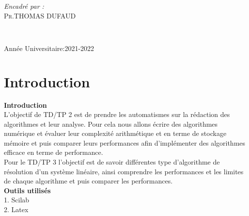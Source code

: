 \documentclass[12pt]{report}
\begin{document}
\begin{titlepage}
\begin{sffamily}
\begin{center}
\begin{minipage}{0.4\textwidth}
\begin{flushleft}
       
      \end{flushleft}
     \end{minipage}
     \begin{minipage}{0.4\textwidth}
      \begin{flushright} \large
       \textit{\Large Encadré par :}\\
       \textsc{\normalsize Pr.THOMAS DUFAUD}\\
       
      \end{flushright}
     \end{minipage}\\[1cm]
     
   
     
     \vfill
     

     {\large Année Universitaire:2021-2022}
     
    \end{center}
   \end{sffamily}
  \end{titlepage}
  

\pagebreak
\normalsize
\hypersetup{pdfborder=0 0 0}
\tableofcontents
\renewcommand{\footrulewidth}{1pt}


\chapter{Introduction}
\textbf{Introduction}\\


L'objectif de TD/TP 2 est de prendre les automatismes sur la rédaction des algorithmes et leur analyse. Pour cela nous allons écrire des algorithmes numérique et évaluer leur complexité arithmétique et en terme de stockage mémoire et puis comparer leurs performances afin d'implémenter des algorithmes efficace en terme de performance.\\

Pour le TD/TP 3 l'objectif est de savoir différentes type d'algorithme de résolution d'un système linéaire, ainsi comprendre les performances et les limites de chaque algorithme et puis comparer les performances.\\

\textbf{Outils utilisés}\\[0.5cm]
1. Scilab\\
2. Latex\\
\end{document}
